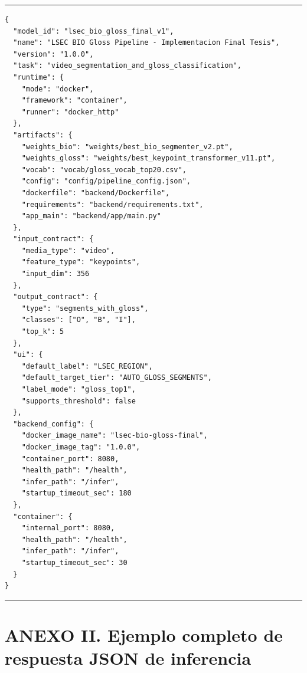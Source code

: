 \begin{center}
\begin{minipage}{0.96\textwidth}
\hrule
\vspace{0.06cm}
\scriptsize
\begin{Verbatim}[baselinestretch=0.68]
{
  "model_id": "lsec_bio_gloss_final_v1",
  "name": "LSEC BIO Gloss Pipeline - Implementacion Final Tesis",
  "version": "1.0.0",
  "task": "video_segmentation_and_gloss_classification",
  "runtime": {
    "mode": "docker",
    "framework": "container",
    "runner": "docker_http"
  },
  "artifacts": {
    "weights_bio": "weights/best_bio_segmenter_v2.pt",
    "weights_gloss": "weights/best_keypoint_transformer_v11.pt",
    "vocab": "vocab/gloss_vocab_top20.csv",
    "config": "config/pipeline_config.json",
    "dockerfile": "backend/Dockerfile",
    "requirements": "backend/requirements.txt",
    "app_main": "backend/app/main.py"
  },
  "input_contract": {
    "media_type": "video",
    "feature_type": "keypoints",
    "input_dim": 356
  },
  "output_contract": {
    "type": "segments_with_gloss",
    "classes": ["O", "B", "I"],
    "top_k": 5
  },
  "ui": {
    "default_label": "LSEC_REGION",
    "default_target_tier": "AUTO_GLOSS_SEGMENTS",
    "label_mode": "gloss_top1",
    "supports_threshold": false
  },
  "backend_config": {
    "docker_image_name": "lsec-bio-gloss-final",
    "docker_image_tag": "1.0.0",
    "container_port": 8080,
    "health_path": "/health",
    "infer_path": "/infer",
    "startup_timeout_sec": 180
  },
  "container": {
    "internal_port": 8080,
    "health_path": "/health",
    "infer_path": "/infer",
    "startup_timeout_sec": 30
  }
}
\end{Verbatim}
\vspace{0.03cm}
\hrule

\label{fig:manifest_ejemplo}
\end{minipage}
\end{center}


\section*{\normalfont ANEXO II. Ejemplo completo de respuesta JSON de inferencia}
\label{anx:respuesta_json}

